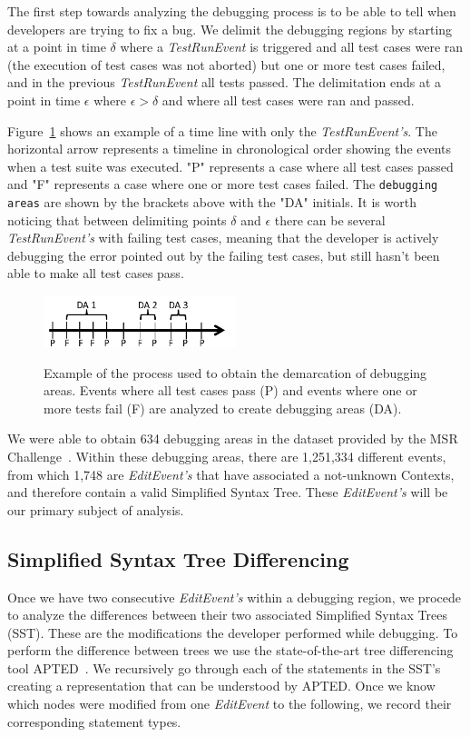 \documentclass[sigconf]{acmart}
\begin{document}
The first step towards analyzing the debugging
process is to be able to tell when
developers are trying to fix a bug.
We delimit the debugging regions by starting at a point
in time $\delta$ where a \textit{TestRunEvent} is triggered and 
all test cases were ran (the execution of test cases
was not aborted) but one or more test cases failed, and in the 
previous \textit{TestRunEvent} all tests passed.
The delimitation ends at a point in time $\epsilon $ where $ \epsilon > \delta$ 
and where all test cases were ran and passed.

Figure~\ref{demarcations} shows an example of a time line
with only the \textit{TestRunEvent's}. The 
horizontal arrow represents a timeline in chronological order showing
the events when a test suite was executed. "P" represents a case
where all test cases passed and "F" represents a case where one
or more test cases failed. The \texttt{debugging areas} are shown by
the brackets above with the "DA" initials. 
It is worth noticing
that between delimiting points $\delta$ and $\epsilon$ there can be 
several \textit{TestRunEvent's} with failing test cases, meaning
that the developer is actively debugging the error pointed out
by the failing test cases, but still hasn't been able to make
all test cases pass.

\begin{figure}[h]
\caption{Example of the process used to obtain the demarcation of
debugging areas. Events where all test cases pass (P) and
events where one or more tests fail (F) are analyzed to create
debugging areas (DA).}
\centering
\includegraphics[width=0.5\textwidth]{images/demarcations.png}
\label{demarcations}
\end{figure}

We were able to obtain 634 debugging areas in the dataset 
provided by the MSR Challenge~\cite{msr18challenge}.
Within these debugging areas, there are 1,251,334
different events, from which 1,748 are \textit{EditEvent's}
that have associated a not-unknown Contexts, and therefore 
contain a valid Simplified Syntax Tree. These \textit{EditEvent's} 
will be our primary subject of analysis.

\subsection{Simplified Syntax Tree Differencing}
\label{sstDiff}
Once we have two consecutive \textit{EditEvent's} within
a debugging region, we procede to analyze the differences
between their two associated Simplified Syntax Trees (SST).
These are the modifications the developer performed
while debugging.
To perform the difference between trees we use the 
state-of-the-art tree differencing
tool APTED~\cite{Pawlik16Apted}.
We recursively go through each of the statements in the 
SST's creating a representation that can be understood by
APTED. 
Once we know which nodes were modified from one \textit{EditEvent}
to the following, we record their corresponding statement types.
\end{document}
